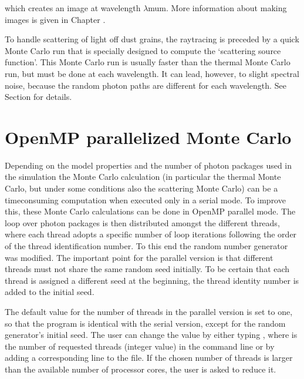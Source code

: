 \documentclass[letterpaper,10pt,english]{sphinxmanual}
\begin{document}
which creates an image at wavelength \(\lambda\)mu\textasciigrave{}m. More information
about making images is given in Chapter {\hyperref[\detokenize{imagesspectra:chap-images-spectra}]{}}.

 To handle scattering of light off dust grains, the ray\sphinxhyphen{}tracing
is preceded by a quick Monte Carlo run that is specially designed to compute the
‘scattering source function’. This Monte Carlo run is usually  faster
than the thermal Monte Carlo run, but must be done at each wavelength. It can
lead, however, to slight spectral noise, because the random photon paths are
different for each wavelength.  See Section {\hyperref[\detokenize{dustradtrans:sec-scattering}]{}} for details.


\section{OpenMP parallelized Monte Carlo}
\label{\detokenize{dustradtrans:openmp-parallelized-monte-carlo}}\label{\detokenize{dustradtrans:sec-omp-mc}}
Depending on the model properties and the number of photon packages used in
the simulation the Monte Carlo calculation (in particular the thermal Monte
Carlo, but under some conditions also the scattering Monte Carlo) can be a
time\sphinxhyphen{}consuming computation when executed only in a serial mode. To improve
this, these Monte Carlo calculations can be done in OpenMP parallel mode.
The loop over photon packages is then distributed amongst the different
threads, where each thread adopts a specific number of loop iterations
following the order of the thread identification number. To this end the
random number generator was modified. The important point for the parallel
version is that different threads must not share the same random seed
initially. To be certain that each thread is assigned a different seed at
the beginning, the thread identity number is added to the initial seed.

The default value for the number of threads in the parallel version is set to
one, so that the program is identical with the serial version, except for the
random generator’s initial seed. The user can change the value by either typing
, where  is the number of requested threads (integer
value) in the command line or by adding a corresponding line to the
 file. If the chosen number of threads is larger than the
available number of processor cores, the user is asked to reduce it.
\end{document}
